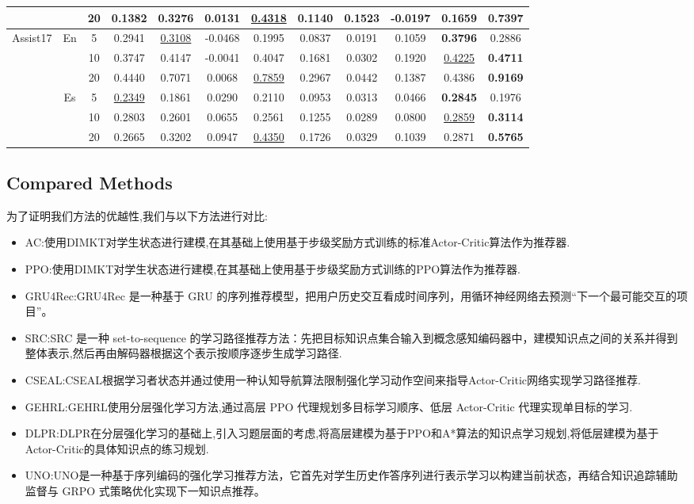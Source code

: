 \documentclass[11pt,a4paper]{article}
\begin{document}
\begin{table}[t]
{\begin{tabular}{cccccccccccc}
 &  & 20 & 0.1382 & 0.3276 & 0.0131 & \underline{0.4318} & 0.1140 & 0.1523 & -0.0197 & 0.1659 & \textbf{0.7397} \\
\midrule
\multirow[c]{6}{*}{Assist17} & \multirow[c]{3}{*}{En} & 5  & 0.2941 & \underline{0.3108} & -0.0468 & 0.1995 & 0.0837 & 0.0191 & 0.1059 & \textbf{0.3796} & 0.2886 \\
 &  & 10 & 0.3747 & 0.4147 & -0.0041 & 0.4047 & 0.1681 & 0.0302 & 0.1920 & \underline{0.4225} & \textbf{0.4711} \\
 &  & 20 & 0.4440 & 0.7071 & 0.0068 & \underline{0.7859} & 0.2967 & 0.0442 & 0.1387 & 0.4386 & \textbf{0.9169} \\
\cmidrule(lr){2-12}
 & \multirow[c]{3}{*}{Es} & 5  & \underline{0.2349} & 0.1861 & 0.0290 & 0.2110 & 0.0953 & 0.0313 & 0.0466 & \textbf{0.2845} & 0.1976 \\
 &  & 10 & 0.2803 & 0.2601 & 0.0655 & 0.2561 & 0.1255 & 0.0289 & 0.0800 & \underline{0.2859} & \textbf{0.3114} \\
 &  & 20 & 0.2665 & 0.3202 & 0.0947 & \underline{0.4350} & 0.1726 & 0.0329 & 0.1039 & 0.2871 & \textbf{0.5765} \\
\bottomrule
\end{tabular}
}
\end{table}

\subsection{Compared Methods}

为了证明我们方法的优越性,我们与以下方法进行对比:
\begin{itemize}
\item AC:使用DIMKT对学生状态进行建模,在其基础上使用基于步级奖励方式训练的标准Actor-Critic算法作为推荐器\cite{sutton1999policy}.
\item PPO:使用DIMKT对学生状态进行建模,在其基础上使用基于步级奖励方式训练的PPO算法作为推荐器\cite{schulman2017proximal}.
\item GRU4Rec:GRU4Rec 是一种基于 GRU 的序列推荐模型，把用户历史交互看成时间序列，用循环神经网络去预测“下一个最可能交互的项目”\cite{hidasi2015session}。
\item SRC:SRC 是一种 set-to-sequence 的学习路径推荐方法：先把目标知识点集合输入到概念感知编码器中，建模知识点之间的关系并得到整体表示,然后再由解码器根据这个表示按顺序逐步生成学习路径\cite{chen2023set}.
\item CSEAL:CSEAL根据学习者状态并通过使用一种认知导航算法限制强化学习动作空间来指导Actor-Critic网络实现学习路径推荐\cite{liu2019exploiting}.
\item GEHRL:GEHRL使用分层强化学习方法,通过高层 PPO 代理规划多目标学习顺序、低层 Actor-Critic 代理实现单目标的学习\cite{li2023graph}.
\item DLPR:DLPR在分层强化学习的基础上,引入习题层面的考虑,将高层建模为基于PPO和A*算法的知识点学习规划,将低层建模为基于Actor-Critic的具体知识点的练习规划\cite{zhang2024item}.
\item UNO:UNO是一种基于序列编码的强化学习推荐方法，它首先对学生历史作答序列进行表示学习以构建当前状态，再结合知识追踪辅助监督与 GRPO 式策略优化实现下一知识点推荐\cite{peng2026uno}。
\end{itemize}
\end{document}
